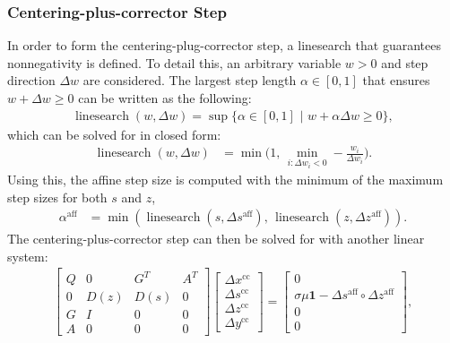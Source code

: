 \subsubsection{Centering-plus-corrector Step}
%
In order to form the centering-plug-corrector step, a linesearch that guarantees nonnegativity is defined. To detail this, an arbitrary variable $w > 0$ and step direction $\Delta w$ are considered. The largest step length $\alpha \in [0, 1]$ that ensures $w + \Delta w \geq 0$ can be written as the following:
%
\begin{align}
    \operatorname{linesearch}(w, \Delta w) = \sup\{\alpha \in [0, 1] \,\,|\,\, w + \alpha \Delta w \geq 0\},
\end{align}
%
which can be solved for in closed form:
%
\begin{align}
    \operatorname{linesearch}(w, \Delta w) &= \min \bigg( 1,\, \min_{i:\Delta w_i < 0} -\frac{w_i}{\Delta w_i} \bigg) .\label{sec:background:linesearch}
\end{align}
%
Using this, the affine step size is computed with the minimum of the maximum step sizes for both $s$ and $z$, 
%
\begin{align}
    \alpha^\text{aff} &= \min( \operatorname{linesearch}(s, \Delta s^\text{aff}),\, \operatorname{linesearch}(z, \Delta z^\text{aff}) ).
\end{align}
%
The centering-plus-corrector step can then be solved for with another linear system:
%
\begin{align}
    \begin{bmatrix}
        Q & 0 & G^{T} & A^{T} \\
        0 & D(z) & D(s) & 0 \\
        G & I & 0 & 0 \\
        A & 0 & 0 & 0
    \end{bmatrix} 
    \begin{bmatrix}
        \Delta x^\text{cc} \\
        \Delta s^\text{cc} \\
        \Delta z^\text{cc} \\
        \Delta y^\text{cc}
    \end{bmatrix}
    = \begin{bmatrix}
        0 \\
        \sigma \mu \mathbf{1} - \Delta s^\text{aff} \circ \Delta z^\text{aff}\\
        0\\
        0
        \end{bmatrix} \label{sec:background:ls_cc},
\end{align}
